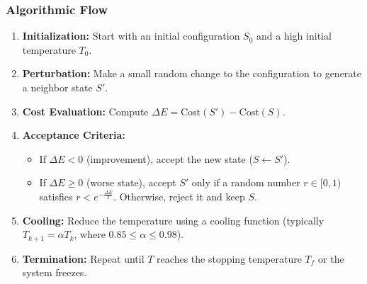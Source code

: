 \documentclass[12pt,a4paper]{article}
\begin{document}
\subsubsection{Algorithmic Flow}
\begin{enumerate}[leftmargin=*, itemsep=2pt]
  \item \textbf{Initialization:} Start with an initial configuration $S_0$ and a high initial temperature $T_0$.
  \item \textbf{Perturbation:} Make a small random change to the configuration to generate a neighbor state $S'$.
  \item \textbf{Cost Evaluation:} Compute $\Delta E = \text{Cost}(S') - \text{Cost}(S)$.
  \item \textbf{Acceptance Criteria:}
    \begin{itemize}[leftmargin=*, label=$\bullet$, itemsep=1pt]
      \item If $\Delta E < 0$ (improvement), accept the new state ($S \leftarrow S'$).
      \item If $\Delta E \ge 0$ (worse state), accept $S'$ only if a random number $r \in [0, 1)$ satisfies $r < e^{-\frac{\Delta E}{T}}$. Otherwise, reject it and keep $S$.
    \end{itemize}
  \item \textbf{Cooling:} Reduce the temperature using a cooling function (typically $T_{k+1} = \alpha T_k$, where $0.85 \le \alpha \le 0.98$).
  \item \textbf{Termination:} Repeat until $T$ reaches the stopping temperature $T_f$ or the system freezes.
\end{enumerate}
\end{document}
